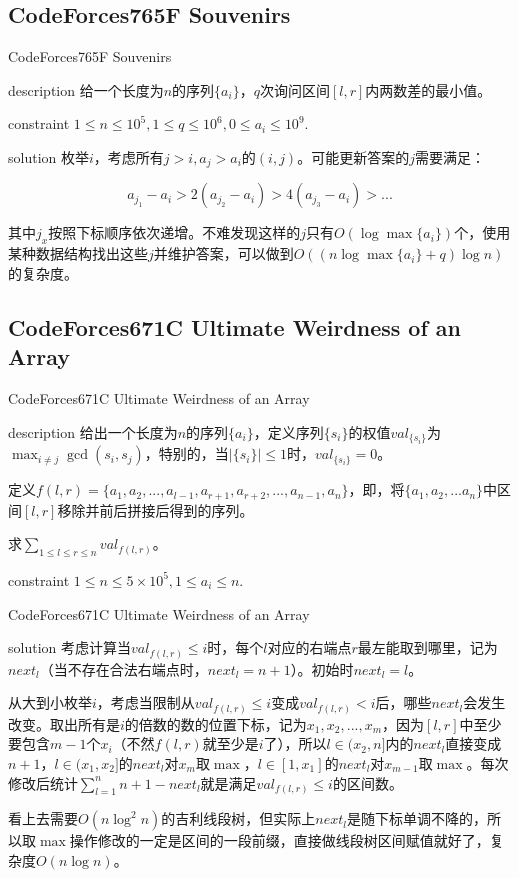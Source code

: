 \documentclass{beamer}
\begin{document}
\subsection{CodeForces765F Souvenirs}
\begin{frame}{CodeForces765F Souvenirs}
\begin{block}{description}
给一个长度为$n$的序列$\{a_i\}$，$q$次询问区间$[l,r]$内两数差的最小值。
\end{block}
\begin{block}{constraint}
$1 \le n \le 10^5, 1 \le q \le 10^6, 0 \le a_i \le 10^9.$
\end{block}
\pause
\begin{block}{solution}
枚举$i$，考虑所有$j>i,a_j>a_i$的$(i,j)$。可能更新答案的$j$需要满足：

$$a_{j_1}-a_i>2(a_{j_2}-a_i)>4(a_{j_3}-a_i)>...$$

其中$j_x$按照下标顺序依次递增。不难发现这样的$j$只有$O(\log \max\{a_i\})$个，使用某种数据结构找出这些$j$并维护答案，可以做到$O((n\log \max\{a_i\}+q)\log n)$的复杂度。
\end{block}
\end{frame}
\subsection{CodeForces671C Ultimate Weirdness of an Array}
\begin{frame}{CodeForces671C Ultimate Weirdness of an Array}
\begin{block}{description}
给出一个长度为$n$的序列$\{a_i\}$，定义序列$\{s_i\}$的权值$val_{\{s_i\}}$为$\max_{i \neq j}\gcd(s_i,s_j)$，特别的，当$|\{s_i\}|\le 1$时，$val_{\{s_i\}}=0$。

定义$f(l,r)=\{a_1,a_2,...,a_{l-1},a_{r+1},a_{r+2},...,a_{n-1},a_n\}$，即，将$\{a_1,a_2,...a_n\}$中区间$[l,r]$移除并前后拼接后得到的序列。

求$\sum_{1 \le l \le r \le n}val_{f(l,r)}$。
\end{block}
\begin{block}{constraint}
$1 \le n \le 5 \times 10^5, 1 \le a_i \le n.$
\end{block}
\end{frame}
\begin{frame}{CodeForces671C Ultimate Weirdness of an Array}
\begin{block}{solution}
考虑计算当$val_{f(l,r)}\le i$时，每个$l$对应的右端点$r$最左能取到哪里，记为$next_l$（当不存在合法右端点时，$next_l=n+1$）。初始时$next_l=l$。

从大到小枚举$i$，考虑当限制从$val_{f(l,r)}\le i$变成$val_{f(l,r)}<i$后，哪些$next_l$会发生改变。取出所有是$i$的倍数的数的位置下标，记为$x_1,x_2,...,x_m$，因为$[l,r]$中至少要包含$m-1$个$x_i$（不然$f(l,r)$就至少是$i$了），所以$l\in(x_2,n]$内的$next_l$直接变成$n+1$，$l\in(x_1,x_2]$的$next_l$对$x_m$取$\max$，$l\in[1,x_1]$的$next_l$对$x_{m-1}$取$\max$。每次修改后统计$\sum_{l=1}^nn+1-next_l$就是满足$val_{f(l,r)}\le i$的区间数。

看上去需要$O(n\log^2n)$的吉利线段树，但实际上$next_l$是随下标单调不降的，所以取$\max$操作修改的一定是区间的一段前缀，直接做线段树区间赋值就好了，复杂度$O(n\log n)$。
\end{block}
\end{frame}
\end{document}
